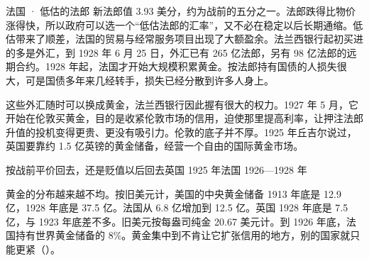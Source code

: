 \begin{case}{法国 · 低估的法郎}
新法郎值 3.93 美分，约为战前的五分之一\cite{dulles1929}。法郎跌得比物价涨得快，所以政府可以选一个“低估法郎的汇率”，又不必在稳定以后长期通缩\cite{brown1940}。低估带来了顺差，法国的贸易与经常服务项目出现了大额盈余\cite{nurkse1944}。法兰西银行起初买进的多是外汇，到 1928 年 6 月 25 日，外汇已有 265 亿法郎，另有 98 亿法郎的远期合约\cite{brown1940}。1928 年起，法国才开始大规模积累黄金\cite{nurkse1944}。按法郎持有国债的人损失很大，可是国债多年来几经转手，损失已经分散到许多人身上\cite{brown1940}。

这些外汇随时可以换成黄金，法兰西银行因此握有很大的权力。1927 年 5 月，它开始在伦敦买黄金，目的是收紧伦敦市场的信用，迫使那里提高利率，让押注法郎升值的投机变得更贵、更没有吸引力\cite{brown1940}。伦敦的底子并不厚。1925 年丘吉尔说过，英国要靠约 1.5 亿英镑的黄金储备，经营一个自由的国际黄金市场\cite{hansard1925}。
\end{case}

\begin{compare}{按战前平价回去，还是贬值以后回去}{英国 1925 年}{法国 1926—1928 年}
\end{compare}

黄金的分布越来越不均。按旧美元计，美国的中央黄金储备 1913 年底是 12.9 亿，1928 年底是 37.5 亿\cite{nurkse1944}。法国从 6.8 亿增加到 12.5 亿\cite{nurkse1944}。英国 1928 年底是 7.5 亿，与 1923 年底差不多\cite{nurkse1944}。旧美元按每盎司纯金 20.67 美元计。到 1926 年底，法国持有世界黄金储备的 8\%\cite{nurkse1944}。黄金集中到不肯让它扩张信用的地方，别的国家就只能更紧（）。


